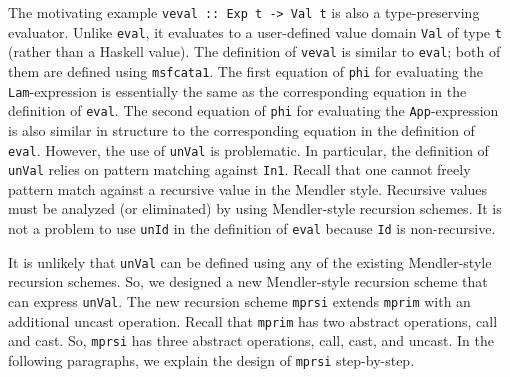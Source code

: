 The motivating example \lstinline{veval :: Exp t -> Val t} is also 
a type-preserving evaluator. Unlike \lstinline{eval}, it evaluates to 
a user-defined value domain \lstinline{Val} of type \lstinline{t} (rather
than a Haskell value). The definition of \lstinline{veval} is similar to
\lstinline{eval}; both of them are defined using \lstinline{msfcata1}.
The first equation of \lstinline{phi} for evaluating
the \lstinline{Lam}-expression is essentially the same as
the corresponding equation in the definition of \lstinline{eval}.
The second equation of \lstinline{phi} for evaluating
the \lstinline{App}-expression is also similar in structure to
the corresponding equation in the definition of \lstinline{eval}.
However, the use of \lstinline{unVal} is problematic. In particular,
the definition of \lstinline{unVal} relies on pattern matching against
\lstinline{In1}. Recall that one cannot freely pattern match against
a recursive value in the Mendler style. Recursive values must be analyzed
(or eliminated) by using Mendler-style recursion schemes. It is not a problem
to use \lstinline{unId} in the definition of \lstinline{eval} because
\lstinline{Id} is non-recursive.

It is unlikely that \lstinline{unVal} can be defined using any of
the existing Mendler-style recursion schemes. So, we designed
a new Mendler-style recursion scheme that can express \lstinline{unVal}.
The new recursion scheme \lstinline{mprsi} extends \lstinline{mprim} with
an additional uncast operation. Recall that \lstinline{mprim} has
two abstract operations, call and cast. So, \lstinline{mprsi} has
three abstract operations, call, cast, and uncast. In the following paragraphs,
we explain the design of \lstinline{mprsi} step-by-step.

